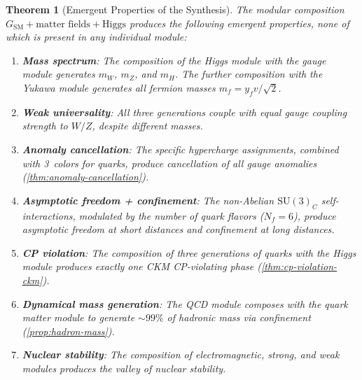 \documentclass[12pt]{article}
\newtheorem{theorem}{Theorem}[section]
\theoremstyle{definition}
\theoremstyle{remark}
\newcommand{\su}[1]{\mathrm{SU}(#1)}
\begin{document}
\begin{theorem}[Emergent Properties of the Synthesis]
\label{thm:emergent-properties}
The modular composition $G_{\mathrm{SM}} + \text{matter fields} + \text{Higgs}$ produces the following emergent properties, none of which is present in any individual module:
\begin{enumerate}
\item \textbf{Mass spectrum}: The composition of the Higgs module with the gauge module generates $m_W$, $m_Z$, and $m_H$. The further composition with the Yukawa module generates all fermion masses $m_f = y_f v / \sqrt{2}$.
\item \textbf{Weak universality}: All three generations couple with equal gauge coupling strength to $W/Z$, despite different masses.
\item \textbf{Anomaly cancellation}: The specific hypercharge assignments, combined with 3~colors for quarks, produce cancellation of all gauge anomalies (\cref{thm:anomaly-cancellation}).
\item \textbf{Asymptotic freedom + confinement}: The non-Abelian $\su{3}_C$ self-interactions, modulated by the number of quark flavors ($N_f = 6$), produce asymptotic freedom at short distances and confinement at long distances.
\item \textbf{CP violation}: The composition of three generations of quarks with the Higgs module produces exactly one CKM CP-violating phase (\cref{thm:cp-violation-ckm}).
\item \textbf{Dynamical mass generation}: The QCD module composes with the quark matter module to generate $\sim 99\%$ of hadronic mass via confinement (\cref{prop:hadron-mass}).
\item \textbf{Nuclear stability}: The composition of electromagnetic, strong, and weak modules produces the valley of nuclear stability.
\end{enumerate}
\end{theorem}
\end{document}
